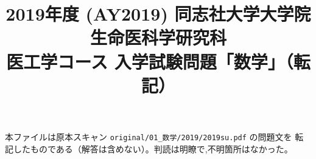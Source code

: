 \documentclass[11pt,a4paper]{article}
\title{2019年度 (AY2019) 同志社大学大学院 生命医科学研究科\\
医工学コース 入学試験問題「数学」（転記）}
\author{}
\date{}
\begin{document}
\maketitle
\vspace{-3em}

\begin{rem}
本ファイルは原本スキャン \texttt{original/01\_数学/2019/2019su.pdf} の問題文を
転記したものである（解答は含めない）。判読は明瞭で,不明箇所はなかった。
\end{rem}

\bigskip

\bigskip

\bigskip

\bigskip

\end{document}

